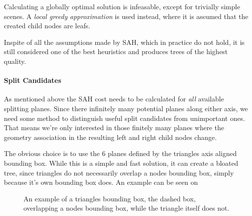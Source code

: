 
Calculating a globally optimal solution is infeasable, except for
trivially simple scenes. A \textit{local greedy approximation} is used
instead, where it is assumed that the created child nodes are
leafs.

Inspite of all the assumptions made by SAH, which in practice do not
hold, it is still considered one of the best heuristics and produces
trees of the highest quality.



\paragraph{Split Candidates}


As mentioned above the SAH cost needs to be calculated for
\textit{all} available splitting planes. Since there infinitely many
potential planes along either axis, we need some method to distinguish
useful split candidates from unimportant ones. That means we're only
interested in those finitely many planes where the geometry
association in the resulting left and right child nodes change.


The obvious choice is to use the 6 planes defined by the triangles
axis aligned bounding box. While this is a simple and fast solution,
it can create a bloated tree, since triangles do not necessarily
overlap a nodes bounding box, simply because it's own bounding box
does. An example can be seen on 

\begin{figure}
  \centering
  \caption[Triangle/Node bounding box intersection.]{An example of a
    triangles bounding box, the dashed box, overlapping a nodes
    bounding box, while the triangle itself does not.}
  \label{fig:aabbSplit}
\end{figure}

